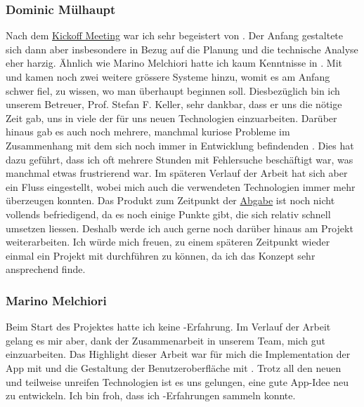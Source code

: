 \subsubsection{Dominic Mülhaupt}
Nach dem \hyperref[pm-ms1]{Kickoff Meeting} war ich sehr begeistert von \kort{}.
Der Anfang gestaltete sich dann aber insbesondere in Bezug auf die Planung und die technische Analyse eher harzig.
Ähnlich wie Marino Melchiori hatte ich kaum Kenntnisse in .
Mit  und  kamen noch zwei weitere grössere Systeme hinzu, womit es am Anfang schwer fiel, zu wissen, wo man überhaupt beginnen soll.
Diesbezüglich bin ich unserem Betreuer, Prof. Stefan F. Keller, sehr dankbar, dass er uns die nötige Zeit gab, uns in viele der für uns neuen Technologien einzuarbeiten.\newline
Darüber hinaus gab es auch noch mehrere, manchmal kuriose Probleme im Zusammenhang mit dem sich noch immer in Entwicklung befindenden .
Dies hat dazu geführt, dass ich oft mehrere Stunden mit Fehlersuche beschäftigt war, was manchmal etwas frustrierend war.
Im späteren Verlauf der Arbeit hat sich aber ein Fluss eingestellt, wobei mich auch die verwendeten Technologien immer mehr überzeugen konnten.
Das Produkt zum Zeitpunkt der \hyperref[pm-ms7]{Abgabe} ist noch nicht vollends befriedigend, da es noch einige Punkte gibt, die sich relativ schnell umsetzen liessen.
Deshalb werde ich auch gerne noch darüber hinaus am Projekt weiterarbeiten.\newline
Ich würde mich freuen, zu einem späteren Zeitpunkt wieder einmal ein Projekt mit  durchführen zu können, da ich das Konzept sehr ansprechend finde.

\subsubsection{Marino Melchiori}
Beim Start des Projektes hatte ich keine -Erfahrung.
Im Verlauf der Arbeit gelang es mir aber, dank der Zusammenarbeit in unserem Team, mich gut  einzuarbeiten.
Das Highlight dieser Arbeit war für mich die Implementation der App mit  und die Gestaltung der Benutzeroberfläche mit .
Trotz all den neuen und teilweise unreifen Technologien ist es uns gelungen, eine gute App-Idee neu zu entwickeln.
Ich bin froh, dass ich -Erfahrungen sammeln konnte.